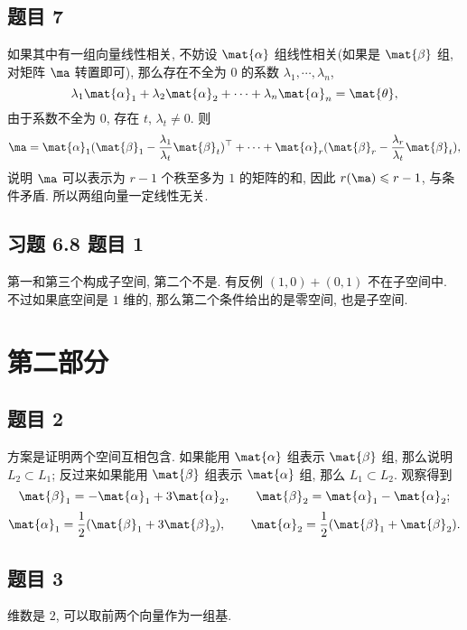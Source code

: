 \subsection*{ 题目 7 }
\begin{solution}
如果其中有一组向量线性相关, 不妨设 $\mat{\alpha}$ 组线性相关(如果是 $\mat{\beta}$ 组, 对矩阵 $\ma$ 转置即可), 那么存在不全为 $0$ 的系数 $\lambda_1, \cdots, \lambda_n$,
\[
    \lambda_1 \mat{\alpha}_1 + \lambda_2 \mat{\alpha}_2 + \cdots + \lambda_n \mat{\alpha}_n = \mat{\theta},
\]
由于系数不全为 $0$, 存在 $t$, $\lambda_t \not= 0$. 则
\[
\ma = \mat{\alpha}_1(\mat{\beta}_1 - \frac{\lambda_1}{\lambda_t} \mat{\beta}_t)^{\top} + \cdots + \mat{\alpha}_r(\mat{\beta}_r - \frac{\lambda_r}{\lambda_t}\mat{\beta}_t),
\]
说明 $\ma$ 可以表示为 $r - 1$ 个秩至多为 $1$ 的矩阵的和, 因此 $r(\ma) \leqslant r - 1$, 与条件矛盾. 所以两组向量一定线性无关.
\end{solution}

\subsection*{ 习题 6.8 题目 1 }
\begin{solution}
第一和第三个构成子空间, 第二个不是. 有反例 $(1, 0) + (0, 1)$ 不在子空间中. 不过如果底空间是 $1$ 维的, 那么第二个条件给出的是零空间, 也是子空间.
\end{solution}

\section{第二部分}

\subsection*{ 题目 2}
\begin{solution}
    方案是证明两个空间互相包含. 如果能用 $\mat{\alpha}$ 组表示 $\mat{\beta}$ 组, 那么说明 $L_2 \subset L_1$; 反过来如果能用 $\mat{\beta}$ 组表示 $\mat{\alpha}$ 组, 那么 $L_1 \subset L_2$. 观察得到
    \[
        \mat{\beta}_1 = -\mat{\alpha}_1 + 3 \mat{\alpha}_2, \qquad \mat{\beta}_2 = \mat{\alpha}_1 - \mat{\alpha}_2;
    \]
    \[
        \mat{\alpha}_1 = \frac{1}{2}(\mat{\beta}_1 + 3\mat{\beta}_2), \qquad \mat{\alpha}_2 = \frac{1}{2}(\mat{\beta}_1 + \mat{\beta}_2).
    \]
\end{solution}

\subsection*{ 题目 3 }
\begin{solution}
维数是 $2$, 可以取前两个向量作为一组基.
\end{solution}

